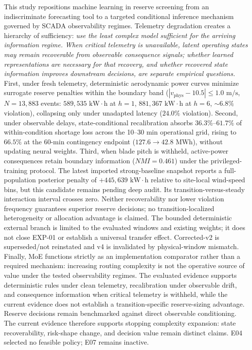 \documentclass[
  journal]{IEEEtran}
\begin{document}
This study repositions machine learning in reserve screening from an
indiscriminate forecasting tool to a targeted conditional inference
mechanism governed by SCADA observability regimes. Telemetry degradation
creates a hierarchy of sufficiency:
\textit{use the least complex model sufficient for the arriving information regime. When critical telemetry is unavailable, latent operating states may remain recoverable from observable consequence signals; whether learned representations are necessary for that recovery, and whether recovered state information improves downstream decisions, are separate empirical questions.}
First, under fresh telemetry, deterministic aerodynamic power curves
minimize surrogate reserve penalties within the boundary band
(\(|v_{\text{phys}}-10.5|\le 1.0\text{ m/s}\), \(N=13{,}883\) events:
\(589{,}535\text{ kW}\cdot\text{h}\) at \(h=1\),
\(881{,}367\text{ kW}\cdot\text{h}\) at \(h=6\), \(\sim 6.8\%\)
violation), collapsing only under unadapted latency (\(24.0\%\)
violation). Second, under observable delays, state-conditional
recalibration absorbs \(36.3\%\)--\(61.7\%\) of within-condition
shortage loss across the 10--30 min operational grid, rising to
\(66.5\%\) at the 60-min contingency endpoint
(\(127.6 \to 42.8\text{ MWh}\)), without updating neural weights. Third,
when blade pitch is withheld, active-power consequences retain boundary
information (\(NMI=0.461\)) under the privileged-training protocol. The
latest imported strong-baseline snapshot reports a full-population
posterior penalty of \(+445{,}639\text{ kW}\cdot\text{h}\) relative to
site-local wind-speed bins, but this candidate remains pending deep
audit. Its transition-versus-steady interaction interval crosses zero.
Neither recoverability nor lower violation frequency guarantees superior
reserve decisions; no transition-localized heterogeneity or allocation
advantage is claimed. The bounded deterministic external branch is
limited to the evaluated windows and existing weights; it does not close
EXP-01 or establish a universal transfer effect. Corrected-v2 is
superseded/not reinstated and v4 is invalidated by physical-window
mismatch. Finally, MoE functions strictly as an implementation
comparator rather than a required mechanism: increasing routing
complexity is not the operative source of value under the tested
observability regimes. The evaluated evidence supports deterministic
rules under clean telemetry, recalibration under observable drift, and
consequence information when critical telemetry is withheld, while the
current evidence does not establish a transition-specific reserve-sizing
advantage. Reserve decisions remain benchmarked against direct
observable conditioning. The current evidence therefore supports
stopping complexity expansion: state recoverability, risk-shape change,
and decision value remain distinct claims. E04 selected no feasible
policy; E07 remains inactive.
\end{document}
